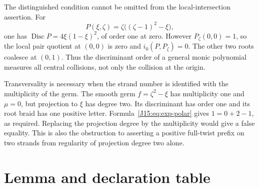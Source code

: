 \documentclass[11pt,oneside]{report}
\theoremstyle{definition}
\numberwithin{equation}{section}
\newcommand{\Disc}{\operatorname{Disc}}
\begin{document}
The distinguished condition cannot be omitted from the local-intersection
assertion. For
\[
 P(\xi,\zeta)=\zeta\bigl((\zeta-1)^2-\xi\bigr),
\]
one has
$\Disc P=4\xi(1-\xi)^2$, of order one at zero.
However $P_\zeta(0,0)=1$, so the local pair quotient at $(0,0)$ is zero
and $i_0(P,P_\zeta)=0$. The other two roots coalesce at $(0,1)$.
Thus the discriminant order of a general monic polynomial measures all
central collisions, not only the collision at the origin.

Transversality is necessary when the strand number is identified with the
multiplicity of the germ. The smooth germ $f=\zeta^2-\xi$ has multiplicity
one and $\mu=0$, but projection to $\xi$ has degree two. Its discriminant
has order one and its root braid has one positive letter.
Formula~\eqref{J15:eq:exp-polar} gives $1=0+2-1$, as required.
Replacing the projection degree by the multiplicity would give a false
equality. This is also the obstruction to asserting a positive full-twist
prefix on two strands from regularity of projection degree two alone.

\section{Lemma and declaration table}
\end{document}
